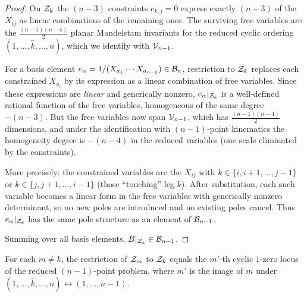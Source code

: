 \begin{proof}
On $\mathcal{Z}_k$ the $(n-3)$ constraints $c_{k,j} = 0$
express exactly $(n-3)$ of the $X_{ij}$ as linear
combinations of the remaining ones.
The surviving free variables are the
$\frac{(n-1)(n-4)}{2}$ planar Mandelstam invariants
for the reduced cyclic ordering
$(1, \ldots, \hat{k}, \ldots, n)$, which we identify
with $\mathcal{V}_{n-1}$.

For a basis element $e_\alpha = 1/(X_{a_1}\cdots X_{a_{n-3}})
\in \mathcal{B}_n$, restriction to $\mathcal{Z}_k$ replaces each constrained
$X_{a_i}$ by its expression as a linear combination of free
variables. Since these expressions are \emph{linear} and
generically nonzero, $e_\alpha|_{\mathcal{Z}_k}$ is a well-defined
rational function of the free variables, homogeneous of the
same degree $-(n-3)$. But the free variables now span
$\mathcal{V}_{n-1}$, which has $\frac{(n-1)(n-4)}{2}$ dimensions,
and under the identification with $(n-1)$-point kinematics
the homogeneity degree is $-(n-4)$ in the reduced
variables (one scale eliminated by the constraints).

More precisely: the constrained variables are the $X_{ij}$
with $k \in \{i, i{+}1, \ldots, j{-}1\}$ or
$k \in \{j, j{+}1, \ldots, i{-}1\}$ (those ``touching''
leg $k$). After substitution, each such variable becomes a
linear form in the free variables with generically nonzero
determinant, so no new poles are introduced and no
existing poles cancel. Thus $e_\alpha|_{\mathcal{Z}_k}$ has the
same pole structure as an element of $\mathcal{B}_{n-1}$.

Summing over all basis elements, $B|_{\mathcal{Z}_k} \in \mathcal{B}_{n-1}$.
\end{proof}

\begin{lemma}
\label{lem:inherited}
For each $m \neq k$, the restriction of $\mathcal{Z}_m$ to $\mathcal{Z}_k$
equals the $m'$-th cyclic $1$-zero locus of the reduced
$(n-1)$-point problem, where $m'$ is the image of $m$
under $(1,\ldots,\hat{k},\ldots,n)
\leftrightarrow (1,\ldots,n-1)$.
\end{lemma}

